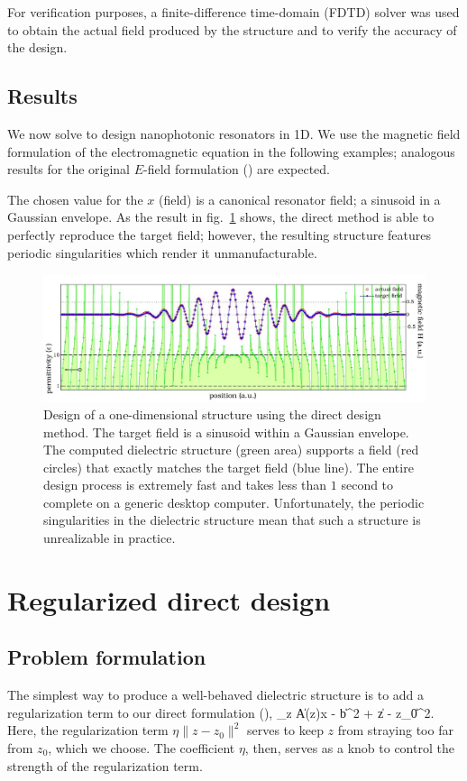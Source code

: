 For verification purposes, 
    a finite-difference time-domain (FDTD) solver was used 
    to obtain the actual field produced by the structure and 
    to verify the accuracy of the design.  

\section{Results}
We now solve  to design nanophotonic resonators in 1D\cite{Lu10}.
We use the magnetic field formulation of the electromagnetic equation
    in the following examples;
    analogous results for the original $E$-field formulation ()
    are expected.

The chosen value for the $x$ (field) is a canonical resonator field; 
    a sinusoid in a Gaussian envelope.
As the result in fig.~\ref{p1:direct} shows,
    the direct method is able to perfectly reproduce the target field;
    however, the resulting structure features
    periodic singularities which render it unmanufacturable.

\begin{figure}[htbp]\centering
\includegraphics[width=\textwidth]{p1/leastsquares}
\caption{Design of a one-dimensional structure using the direct design method.
    The target field is a sinusoid within a Gaussian envelope. 
    The computed dielectric structure (green area) supports 
        a field (red circles) that exactly matches the target field (blue line). 
    The entire design process is extremely fast and takes less than 
        $1$ second to complete on a generic desktop computer.
    Unfortunately, the periodic singularities in the dielectric structure 
        mean that such a structure is unrealizable in practice.}
\label{p1:direct}\end{figure}

\chapter{Regularized direct design}\label{regularized}
\section{Problem formulation}
The simplest way to produce a well-behaved dielectric structure is 
    to add a regularization term to our direct formulation (),
    \BE \minimize_z \|A(z)x - b\|^2 + \eta \|z - z_0\|^2. \label{reg:problem}\EE
Here, the regularization term $\eta \|z - z_0\|^2$
    serves to keep $z$ from straying too far from $z_0$, which we choose.
The coefficient $\eta$, then, serves as a knob to control the
    strength of the regularization term.


